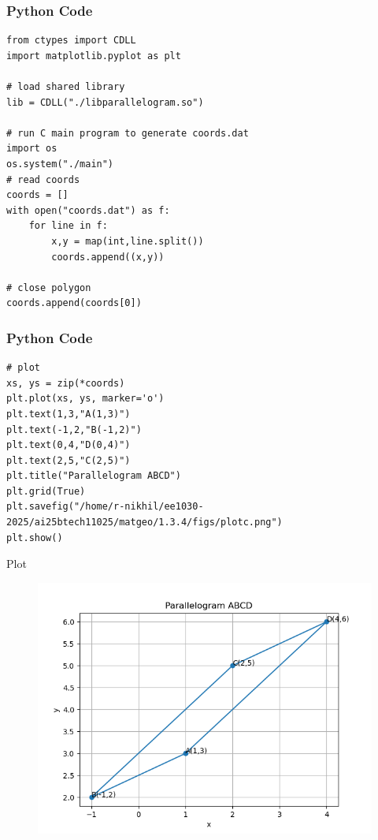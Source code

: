\documentclass{beamer}
\begin{document}
\begin{frame}[fragile]
\frametitle{Python Code}
   \begin{lstlisting}
from ctypes import CDLL
import matplotlib.pyplot as plt

# load shared library
lib = CDLL("./libparallelogram.so")

# run C main program to generate coords.dat
import os
os.system("./main")
# read coords
coords = []
with open("coords.dat") as f:
    for line in f:
        x,y = map(int,line.split())
        coords.append((x,y))

# close polygon
coords.append(coords[0])

\end{lstlisting}
\end{frame}


\begin{frame}[fragile]
\frametitle{Python Code}
   \begin{lstlisting}
# plot
xs, ys = zip(*coords)
plt.plot(xs, ys, marker='o')
plt.text(1,3,"A(1,3)")
plt.text(-1,2,"B(-1,2)")
plt.text(0,4,"D(0,4)")
plt.text(2,5,"C(2,5)")
plt.title("Parallelogram ABCD")
plt.grid(True)
plt.savefig("/home/r-nikhil/ee1030-2025/ai25btech11025/matgeo/1.3.4/figs/plotc.png")
plt.show()

\end{lstlisting}
\end{frame}

\begin{frame}{Plot}
\begin{figure}[h!]
    \centering
    \includegraphics[height=0.6\textheight, keepaspectratio]{figs/plotc.png}
    \label{figure_1}
\end{figure}

\end{frame}
    
\end{document}
